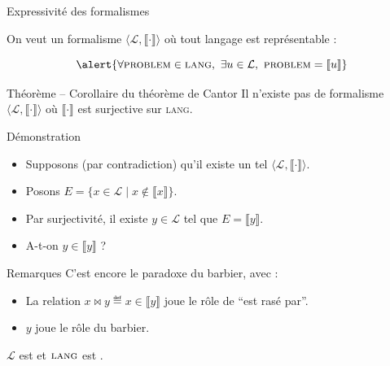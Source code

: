 
\begingroup

\newcommand\PROBLEM{\textsc{problem}}

\begin{frame}{Expressivité des formalismes}

  On veut un formalisme $\langle \mathcal{L}, \llbracket \cdot \rrbracket \rangle$ où tout langage est représentable :

  \vspace{-2mm}
  $$\alert{\forall \PROBLEM \in \textsc{lang},~ \exists u \in \mathcal{L},~ \PROBLEM = \llbracket u \rrbracket}$$
  
  \begin{block}{Théorème -- Corollaire du théorème de Cantor}
    Il n'existe pas de formalisme $\langle \mathcal{L}, \llbracket \cdot \rrbracket \rangle$
    où $\llbracket \cdot \rrbracket$ est surjective sur \textsc{lang}.
  \end{block}

  \vspace{-1mm}
  \begin{alertblock}{Démonstration}
    \begin{itemize}
    \item Supposons (par contradiction) qu'il existe un tel $\langle \mathcal{L}, \llbracket \cdot \rrbracket \rangle$.
    \item Posons $E = \{ x \in \mathcal{L} \mid x \notin \llbracket x \rrbracket\}$.
    \item Par surjectivité, il existe $y \in \mathcal{L}$ tel que $E = \llbracket y \rrbracket$.
    \item A-t-on $y \in \llbracket y \rrbracket$ ?
    \end{itemize}
  \end{alertblock}

  \vspace{-1mm}
  \begin{block}{Remarques}
    C'est encore le paradoxe du barbier, avec :
    \begin{itemize}
    \item La relation $x \bowtie y \eqdef x \in \llbracket y \rrbracket$ joue le rôle de ``est rasé par''.
    \item $y$ joue le rôle du barbier.
    \end{itemize}
    $\mathcal{L}$ est  et $\textsc{lang}$ est .
  \end{block}
  
\end{frame}

\endgroup
\endinput
